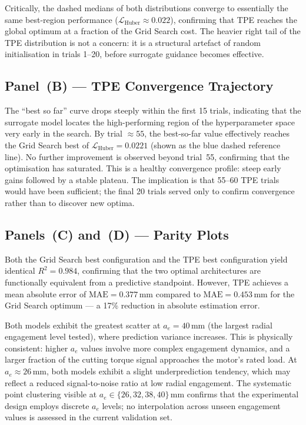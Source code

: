 \documentclass[11pt, a4paper]{article}
\newcommand{\Lhuber}{\mathcal{L}_{\text{Huber}}}
\newcommand{\ae}{a_e}
\newcommand{\MAE}{\text{MAE}}
\newcommand{\Rtwo}{R^2}
\begin{document}
Critically, the dashed medians of both distributions converge to essentially the
same best-region performance ($\Lhuber \approx 0.022$), confirming that TPE
reaches the global optimum at a fraction of the Grid Search cost.
The heavier right tail of the TPE distribution is not a concern: it is a structural
artefact of random initialisation in trials 1–20, before surrogate guidance becomes
effective.

\subsection{Panel~(B) — TPE Convergence Trajectory}
\label{sec:fig1b}

The ``best so far'' curve drops steeply within the first 15 trials, indicating
that the surrogate model locates the high-performing region of the hyperparameter
space very early in the search.
By trial $\approx 55$, the best-so-far value effectively reaches the Grid Search
best of $\Lhuber = 0.0221$ (shown as the blue dashed reference line).
No further improvement is observed beyond trial~55, confirming that the optimisation
has saturated.
This is a healthy convergence profile: steep early gains followed by a stable
plateau.
The implication is that 55--60 TPE trials would have been sufficient; the final
20 trials served only to confirm convergence rather than to discover new optima.

\subsection{Panels~(C) and~(D) — Parity Plots}
\label{sec:fig1cd}

Both the Grid Search best configuration and the TPE best configuration yield
identical $\Rtwo = 0.984$, confirming that the two optimal architectures are
functionally equivalent from a predictive standpoint.
However, TPE achieves a mean absolute error of $\MAE = 0.377\,\text{mm}$ compared
to $\MAE = 0.453\,\text{mm}$ for the Grid Search optimum — a 17\% reduction in
absolute estimation error.

Both models exhibit the greatest scatter at $\ae = 40\,\text{mm}$ (the largest
radial engagement level tested), where prediction variance increases.
This is physically consistent: higher $\ae$ values involve more complex engagement
dynamics, and a larger fraction of the cutting torque signal approaches the motor's
rated load.
At $\ae \approx 26\,\text{mm}$, both models exhibit a slight underprediction
tendency, which may reflect a reduced signal-to-noise ratio at low radial engagement.
The systematic point clustering visible at $\ae \in \{26, 32, 38, 40\}\,\text{mm}$
confirms that the experimental design employs discrete $\ae$ levels; no
interpolation across unseen engagement values is assessed in the current validation
set.
\end{document}
